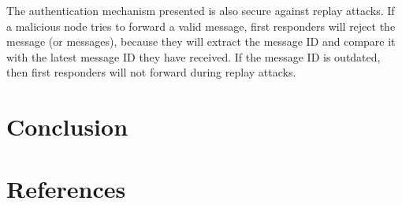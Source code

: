 \documentclass[letterpaper]{article}
\begin{document}
The authentication mechanism presented is also secure against replay attacks. If a malicious node tries to forward a valid message, first responders will reject the message (or messages), because they will extract the message ID and compare it with the latest message ID they have received. If the message ID is outdated, then first responders will not forward during replay attacks.

\section{Conclusion}

\section{References}
\end{document}
